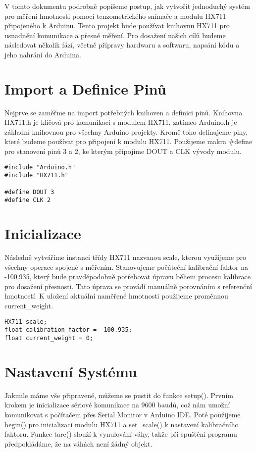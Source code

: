 

V tomto dokumentu podrobně popíšeme postup, jak vytvořit jednoduchý systém pro měření hmotnosti pomocí tenzometrického snímače a modulu HX711 připojeného k Arduinu.
Tento projekt bude používat knihovnu HX711 pro usnadnění komunikace a přesné měření.
Pro dosažení našich cílů budeme následovat několik fází, včetně přípravy hardwaru a softwaru, napsání kódu a jeho nahrání do Arduina.

\section*{Import a Definice Pinů}
Nejprve se zaměřme na import potřebných knihoven a definici pinů.
Knihovna HX711.h je klíčová pro komunikaci s modulem HX711, zatímco Arduino.h je základní knihovnou pro všechny Arduino projekty.
Kromě toho definujeme piny, které budeme používat pro připojení k modulu HX711.
Použijeme makra \#define pro stanovení pinů 3 a 2, ke kterým připojíme DOUT a CLK vývody modulu.

\begin{lstlisting}
#include "Arduino.h"
#include "HX711.h"

#define DOUT 3
#define CLK 2
\end{lstlisting}

\section*{Inicializace}
Následně vytváříme instanci třídy HX711 nazvanou scale, kterou využijeme pro všechny operace spojené s měřením.
Stanovujeme počáteční kalibrační faktor na -100.935, který bude pravděpodobně potřebovat úpravu během procesu kalibrace pro dosažení přesnosti.
Tato úprava se provádí manuálně porovnáním s referenční hmotností.
K uložení aktuální naměřené hmotnosti použijeme proměnnou current\_weight.

\begin{lstlisting}
HX711 scale;
float calibration_factor = -100.935;
float current_weight = 0;
\end{lstlisting}

\section*{Nastavení Systému}
Jakmile máme vše připravené, můžeme se pustit do funkce setup().
Prvním krokem je inicializace sériové komunikace na 9600 baudů, což nám umožní komunikovat s počítačem přes Serial Monitor v Arduino IDE. Poté použijeme begin() pro inicializaci modulu HX711 a set\_scale() k nastavení kalibračního faktoru.
Funkce tare() slouží k vynulování váhy, takže při spuštění programu předpokládáme, že na váhách není žádný objekt.

